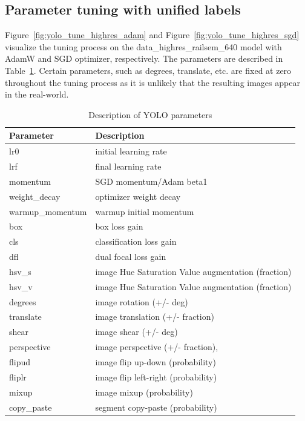 \documentclass[Master,MDS,english]{BASE/twbook} %
\begin{document}

\subsection{Parameter tuning with unified labels} \label{app:yolo_parameters}

Figure~\ref{fig:yolo_tune_highres_adam} and Figure~\ref{fig:yolo_tune_highres_sgd} visualize the tuning process on the data\_highres\_railsem\_640 model  with AdamW and SGD optimizer, respectively.
The parameters are described in Table~\ref{tab:yolo_parameters}. Certain parameters, such as degrees, translate, etc. are fixed at zero throughout the tuning process as it is unlikely that the resulting images appear in the real-world.


\begin{table}[h]
\footnotesize
\centering
\begin{tabular}{|l|l|}
\hline
\textbf{Parameter} & \textbf{Description} \\ \hline
lr0 & initial learning rate \\ 
lrf & final learning rate \\ 
momentum & SGD momentum/Adam beta1 \\ 
weight\_decay & optimizer weight decay \\ 
warmup\_momentum & warmup initial momentum \\ 
box & box loss gain \\ 
cls & classification loss gain \\ 
dfl & dual focal loss gain \\ 
hsv\_s & image Hue Saturation Value augmentation (fraction) \\ 
hsv\_v & image Hue Saturation Value augmentation (fraction) \\ 
degrees & image rotation (+/- deg) \\ 
translate & image translation (+/- fraction) \\ 
shear & image shear (+/- deg) \\ 
perspective & image perspective (+/- fraction),\\ 
flipud & image flip up-down (probability) \\ 
fliplr & image flip left-right (probability) \\ 
mixup & image mixup (probability) \\ 
copy\_paste & segment copy-paste (probability) \\ \hline
\end{tabular}
\caption{Description of YOLO parameters}
\label{tab:yolo_parameters}
\end{table}
\end{document}
